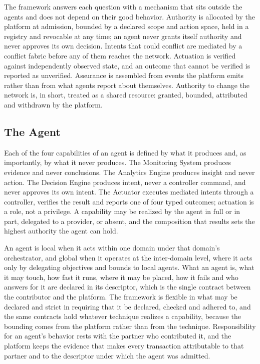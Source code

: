 The framework answers each question with a mechanism that sits outside
the agents and does not depend on their good behavior. Authority is
allocated by the platform at admission, bounded by a declared scope and
action space, held in a registry and revocable at any time; an agent
never grants itself authority and never approves its own decision.
Intents that could conflict are mediated by a conflict fabric before any
of them reaches the network. Actuation is verified against independently
observed state, and an outcome that cannot be verified is reported as
unverified. Assurance is assembled from events the platform emits rather
than from what agents report about themselves. Authority to change the
network is, in short, treated as a shared resource: granted, bounded,
attributed and withdrawn by the platform.

\hypertarget{the-agent}{%
\subsection{The Agent}\label{the-agent}}

Each of the four capabilities of an agent is defined by what it produces
and, as importantly, by what it never produces. The Monitoring System
produces evidence and never conclusions. The Analytics Engine produces
insight and never action. The Decision Engine produces intent, never a
controller command, and never approves its own intent. The Actuator
executes mediated intents through a controller, verifies the result and
reports one of four typed outcomes; actuation is a role, not a
privilege. A capability may be realized by the agent in full or in part,
delegated to a provider, or absent, and the composition that results
sets the highest authority the agent can hold.

An agent is local when it acts within one domain under that domain's
orchestrator, and global when it operates at the inter-domain level,
where it acts only by delegating objectives and bounds to local agents.
What an agent is, what it may touch, how fast it runs, where it may be
placed, how it fails and who answers for it are declared in its
descriptor, which is the single contract between the contributor and the
platform. The framework is flexible in what may be declared and strict
in requiring that it be declared, checked and adhered to, and the same
contracts hold whatever technique realizes a capability, because the
bounding comes from the platform rather than from the technique.
Responsibility for an agent's behavior rests with the partner who
contributed it, and the platform keeps the evidence that makes every
transaction attributable to that partner and to the descriptor under
which the agent was admitted.

